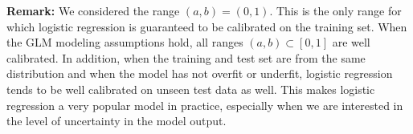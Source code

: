 \textbf{Remark:}  We considered the range $(a,b) = (0, 1)$. This is the only
range for which logistic regression is guaranteed to be calibrated on the
training set. When the GLM modeling assumptions hold, all ranges $(a,b) \subset
[0,1]$ are well calibrated. In addition, when the training and test set are
from the same distribution and when the model has not overfit or underfit,
logistic regression tends to be well calibrated on unseen test data as well.
This makes logistic regression a very popular model in practice, especially
when we are interested in the level of uncertainty in the model output.
